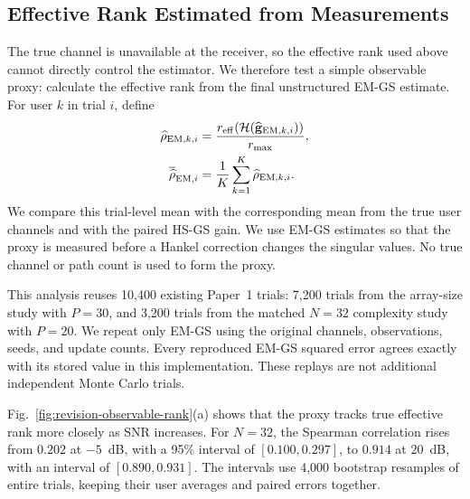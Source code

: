
\subsection{Effective Rank Estimated from Measurements}
\label{sec:revision-observable-rank}

The true channel is unavailable at the receiver, so the effective rank
used above cannot directly control the estimator. We therefore test a
simple observable proxy: calculate the effective rank from the final
unstructured EM-GS estimate. For user $k$ in trial $i$, define
\begin{equation}
\begin{aligned}
\widehat\rho_{{\rm EM},k,i}
&=\frac{r_{\rm eff}\!\left(\mathcal H(
  \widehat{\mathbf g}_{{\rm EM},k,i})\right)}{r_{\max}},\\
\overline{\widehat\rho}_{{\rm EM},i}
&=\frac{1}{K}\sum_{k=1}^{K}\widehat\rho_{{\rm EM},k,i}.
\end{aligned}
\label{eq:revision-observable-rho}
\end{equation}
We compare this trial-level mean with the corresponding mean from the
true user channels and with the paired HS-GS gain. We use EM-GS estimates
so that the proxy is measured before a Hankel correction changes the
singular values. No true channel or path count is used to form the proxy.

This analysis reuses 10,400 existing Paper~1 trials: 7,200 trials from the
array-size study with $P=30$, and 3,200 trials from the matched $N=32$
complexity study with $P=20$. We repeat only EM-GS using the original
channels, observations, seeds, and update counts. Every reproduced EM-GS
squared error agrees exactly with its stored value in this implementation.
These replays are not additional independent Monte Carlo trials.

Fig.~\ref{fig:revision-observable-rank}(a) shows that the proxy tracks
true effective rank more closely as SNR increases. For $N=32$, the
Spearman correlation rises from $0.202$ at $-5$~dB, with a 95\% interval
of $[0.100,0.297]$, to $0.914$ at $20$~dB, with an interval of
$[0.890,0.931]$. The intervals use 4,000 bootstrap resamples of entire
trials, keeping their user averages and paired errors together.

